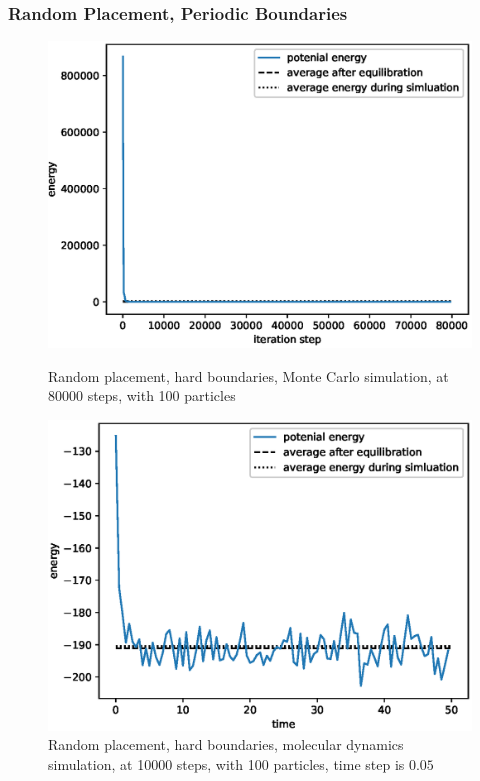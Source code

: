 \documentclass[UTF8,a4paper,no-math]{article}
\begin{document}
\subsubsection{Random Placement, Periodic Boundaries}
\begin{figure}[H]
	\centering
	\begin{minipage}[t]{0.45\textwidth}
		\centering
		\includegraphics[height=0.2\textheight]{fig/plot_hb_80000_steps_100_particles_0.8442_rho_0.728_tempure_1.eps}
		\caption{Random placement, hard boundaries, Monte Carlo simulation, at 80000 steps, with 100 particles}
	\end{minipage}\hspace{0.5cm}
	\begin{minipage}[t]{0.45\textwidth}
		\centering
		\includegraphics[height=0.2\textheight]{fig/md_plot_rand_hard_10000_steps_100_particles_0.8442_rho_0.728_tempure_.eps}
		\caption{Random placement, hard boundaries, molecular dynamics simulation, at 10000 steps, with 100 particles, time step is $0.05$}
	\end{minipage}
\end{figure}
\end{document}
